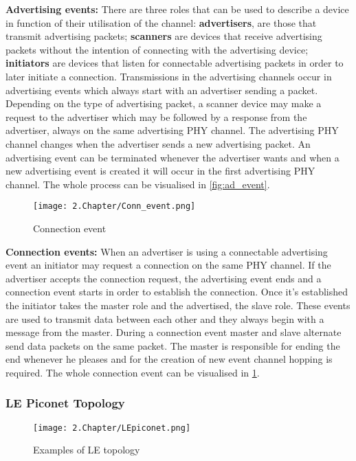 \tab \textbf{Advertising events:} There are three roles that can be used to describe a device in function of their utilisation of the channel: \textbf{advertisers}, are those that transmit advertising packets; \textbf{scanners} are devices that receive advertising packets without the intention of connecting with the advertising device; \textbf{initiators} are devices that listen for connectable advertising packets in order to later initiate a connection.
Transmissions in the advertising channels occur in advertising events which always start with an advertiser sending a packet. Depending on the type of advertising packet, a scanner device may make a request to the advertiser which may be followed by a response from the advertiser, always on the same advertising \ac{PHY} channel. The advertising \ac{PHY} channel changes when the advertiser sends a new advertising packet. An advertising event can be terminated whenever the advertiser wants and when a new advertising event is created it will  occur in the first advertising \ac{PHY} channel. The whole process can be visualised in \ref{fig:ad_event}.

\begin{figure}[H]
	\centering
		\texttt{[image: 2.Chapter/Conn\_event.png]}
	\caption[Connection Event]{Connection event}
	\label{fig:conn_event}
\end{figure}

\tab \textbf{Connection events:} When an advertiser is using a connectable advertising event an initiator may request a connection on the same \ac{PHY} channel. If the advertiser accepts the connection request, the advertising event ends and a connection event starts in order to establish the connection. Once it's established the initiator takes the master role and the advertised, the slave role. These events are used to transmit data between each other and they always begin with a message from the master. During a connection event master and slave alternate send data packets on the same packet. The master is responsible for ending the end whenever he pleases and for the creation of new event channel hopping is required. The whole connection event can be visualised in \ref{fig:conn_event}. 

\subsubsection{\ac{LE} Piconet Topology}
\label{subsec:piconet}

\begin{figure}[H]
	\centering
		\texttt{[image: 2.Chapter/LEpiconet.png]}
	\caption[LE Topology]{Examples of LE topology}
	\label{fig:LEpiconet}
\end{figure}

